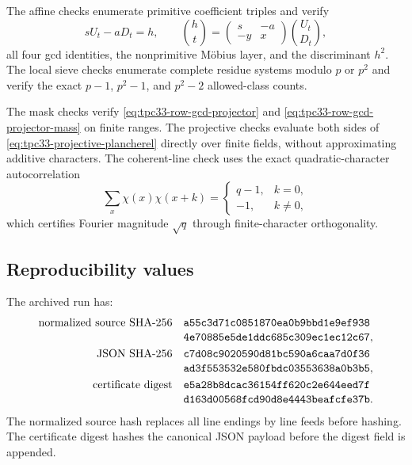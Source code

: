 The affine checks enumerate primitive coefficient triples and verify
\begin{equation}
 sU_t-aD_t=h,\qquad
 \binom ht=\begin{pmatrix}s&-a\\-y&x\end{pmatrix}\binom{U_t}{D_t},
 \label{eq:tpc33-certificate-affine}
\end{equation}
all four gcd identities, the nonprimitive M\"obius layer, and the
discriminant \(h^2\).  The local sieve checks enumerate complete residue
systems modulo \(p\) or \(p^2\) and verify the exact \(p-1\),
\(p^2-1\), and \(p^2-2\) allowed-class counts.

The mask checks verify
\eqref{eq:tpc33-row-gcd-projector} and
\eqref{eq:tpc33-row-gcd-projector-mass} on finite ranges.  The projective
checks evaluate both sides of
\eqref{eq:tpc33-projective-plancherel} directly over finite fields, without
approximating additive characters.  The coherent-line check uses the exact
quadratic-character autocorrelation
\begin{equation}
 \sum_x\chi(x)\chi(x+k)
 =\begin{cases}q-1,&k=0,\\-1,&k\ne0,
 \end{cases}
 \label{eq:tpc33-certificate-character-autocorrelation}
\end{equation}
which certifies Fourier magnitude \(\sqrt q\) through finite-character
orthogonality.

\subsection{Reproducibility values}

The archived run has:
\begin{align}
 \text{normalized source SHA-256}\quad
 &\texttt{a55c3d71c0851870ea0b9bbd1e9ef938}
 \notag\\[-0.2em]
 &\texttt{4e70885e5de1ddc685c309ec1ec12c67},
 \label{eq:tpc33-source-hash}\\
 \text{JSON SHA-256}\quad
 &\texttt{c7d08c9020590d81bc590a6caa7d0f36}
 \notag\\[-0.2em]
 &\texttt{ad3f553532e580fbdc03553638a0b3b5},
 \label{eq:tpc33-json-hash}\\
 \text{certificate digest}\quad
 &\texttt{e5a28b8dcac36154ff620c2e644eed7f}
 \notag\\[-0.2em]
 &\texttt{d163d00568fcd90d8e4443beafcfe37b}.
 \label{eq:tpc33-certificate-digest}
\end{align}
The normalized source hash replaces all line endings by line feeds before
hashing.  The certificate digest hashes the canonical JSON payload before
the digest field is appended.


